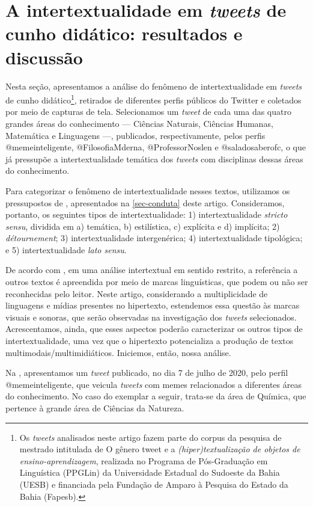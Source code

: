\documentclass{textolivre}
\begin{document}
\section{A intertextualidade em \textit{tweets} de cunho didático: resultados e discussão}\label{sec-fmt-manuscrito}
Nesta seção, apresentamos a análise do fenômeno de intertextualidade em \textit{tweets} de cunho didático\footnote{Os \textit{tweets} analisados neste artigo fazem parte do corpus da pesquisa de mestrado intitulada de O gênero tweet e a \textit{(hiper)textualização de objetos de ensino-aprendizagem}, realizada no Programa de Pós-Graduação em Linguística (PPGLin) da Universidade Estadual do Sudoeste da Bahia (UESB) e financiada pela Fundação de Amparo à Pesquisa do Estado da Bahia (Fapesb).}, retirados de diferentes perfis públicos do Twitter e coletados por meio de capturas de tela. Selecionamos um \textit{tweet} de cada uma das quatro grandes áreas do conhecimento — Ciências Naturais, Ciências Humanas, Matemática e Linguagens —, publicados, respectivamente, pelos perfis @memeinteligente, @FilosofiaMderna, @ProfessorNoslen e @saladosaberofc, o que já pressupõe a intertextualidade temática dos \textit{tweets} com disciplinas dessas áreas do conhecimento.

Para categorizar o fenômeno de intertextualidade nesses textos, utilizamos os pressupostos de \textcite{koch_intertextualidade:_2012}, apresentados na \cref{sec-conduta} deste artigo. Consideramos, portanto, os seguintes tipos de intertextualidade: 1) intertextualidade \textit{stricto sensu}, dividida em a) temática, b) estilística, c) explícita e d) implícita; 2) \textit{détournement}; 3) intertextualidade intergenérica; 4) intertextualidade tipológica; e 5) intertextualidade \textit{lato sensu}.

De acordo com \textcite{araujo_consideracoes_2009}, em uma análise intertextual em sentido restrito, a referência a outros textos é apreendida por meio de marcas linguísticas, que podem ou não ser reconhecidas pelo leitor. Neste artigo, considerando a multiplicidade de linguagens e mídias presentes no hipertexto, estendemos essa questão às marcas visuais e sonoras, que serão observadas na investigação dos \textit{tweets} selecionados. Acrescentamos, ainda, que esses aspectos poderão caracterizar os outros tipos de intertextualidade, uma vez que o hipertexto potencializa a produção de textos multimodais/multimidiáticos. Iniciemos, então, nossa análise.

Na , apresentamos um \textit{tweet} publicado, no dia 7 de julho de 2020, pelo perfil @memeinteligente, que veicula \textit{tweets} com memes relacionados a diferentes áreas do conhecimento. No caso do exemplar a seguir, trata-se da área de Química, que pertence à grande área de Ciências da Natureza.
\end{document}
